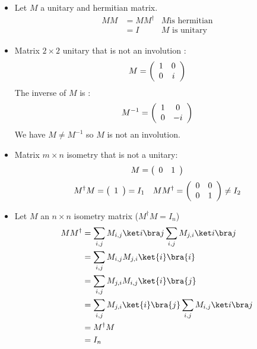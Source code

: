\begin{itemize}
  \item Let $M$ a unitary and hermitian matrix.
    \begin{align*}
      M M &= M M^\dagger & M \text{is hermitian} \\
          &= I & M \text{ is unitary}
    \end{align*}
  \item Matrix $2\times 2$ unitary that is not an involution :
    \begin{align*}
      M = \left(
      \begin{array}{c c}
        1 & 0\\
        0 & i\\
      \end{array}
      \right)
    \end{align*}
    The inverse of $M$ is :
    \begin{align*}
      M^{-1} = \left(
      \begin{array}{c c}
        1 & 0\\
        0 & -i\\
      \end{array}
      \right)
    \end{align*}
    We have $M \not = M^{-1}$ so $M$ is not an involution.
  \item Matrix $m\times n$ isometry that is not a unitary:
    \begin{align*}
      M = \left(
      \begin{array}{c c}
        0 & 1\\
      \end{array}
      \right)
    \end{align*}
    \begin{align*}
      M^\dagger M =
      \left(\begin{array}{c}
        1\\
      \end{array}
      \right) = I_1
      \quad
      MM^\dagger =
      \left(\begin{array}{c c}
        0 & 0\\
        0 & 1
      \end{array}
      \right) \not = I_2
    \end{align*}
  \item Let $M$ an $n \times n$ isometry matrix ($M^\dagger M = I_n$)
    \begin{align*}
      MM^\dagger &=
      \sum_{i,j} M_{i,j} \ket i \bra j \sum_{i,j} M_{j,i} \ket i \bra j \\
      &= \sum_{i,j} M_{i,j} M_{j,i} \ket{i} \bra{i} \\
      &= \sum_{i,j} M_{j,i} M_{i,j} \ket{i} \bra{j} \\
      &= \sum_{i,j} M_{j,i} \ket{i} \bra{j} \sum_{i,j} M_{i,j} \ket i \bra j \\
      &= M^\dagger M \\
      &= I_n
    \end{align*}

\end{itemize}
